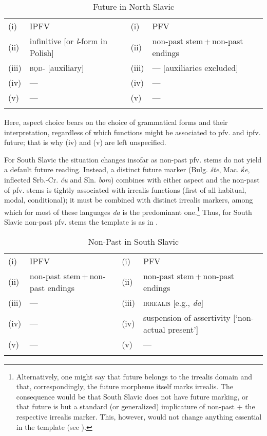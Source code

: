 \documentclass[output=paper]{langscibook}
\begin{document}
\begin{table}
\caption{Future in North Slavic\label{tab:wiemer:xx}}
\begin{tabularx}{\textwidth}{l@{ }ll@{ }Q}
\lsptoprule
(i)   & IPFV                                        & (i)   & PFV\\
(ii)  & infinitive [or \textit{l}{}-form in Polish] & (ii)  & non-past stem\,+\,non-past endings\\
(iii) & \textsc{bǫd}{}- [auxiliary]                 & (iii) & {}--- [auxiliaries excluded]\\
(iv)  & {}---                                       & (iv)  &  {}---\\
(v)   & {}---                                       & (v)   & {}---\\
\lspbottomrule                                      
\end{tabularx}
\end{table}


Here, aspect choice bears on the choice of grammatical forms and their interpretation, regardless of which functions might be associated to pfv. and ipfv. future; that is why (iv) and (v) are left unspecified.

For South Slavic the situation changes insofar as non-past pfv. stems do not yield a default future reading. Instead, a distinct future marker (Bulg. \textit{šte}, Mac. \textit{{\'к}e}, inflected Srb.-Cr. \textit{ću} and Sln. \textit{bom}) combines with either aspect and the non-past of pfv. stems is tightly associated with irrealis functions (first of all habitual, modal, conditional); it must be combined with distinct irrealis markers, among which for most of these languages \textit{da} is the predominant one.\footnote{Alternatively, one might say that future belongs to the irrealis domain and that, correspondingly, the future morpheme itself marks irrealis. The consequence would be that South Slavic does not have future marking, or that future is but a standard (or generalized) implicature of non-past + the respective irrealis marker. This, however, would not change anything essential in the template (see ).} Thus, for South Slavic non-past pfv. stems the template is as in .

\begin{table}
\caption{Non-Past in South Slavic\label{tab:wiemer:xy}}
\begin{tabularx}{\textwidth}{l@{ }ll@{ }Q}
\lsptoprule
(i)   & IPFV                             & (i)  & PFV\\
(ii)  & non-past stem\,+\,non-past endings & (ii) & non-past stem\,+\,non-past endings\\
(iii) & \textsc{{}---}                   & (iii)&  \textsc{irrealis} [e.g., \textit{da}]\\
(iv)  & {}---                            & (iv) & suspension of assertivity [‘non-actual present’]\\
(v)   & {}---                            & (v) & {}---\\
\lspbottomrule
\end{tabularx}
\end{table}
\end{document}
